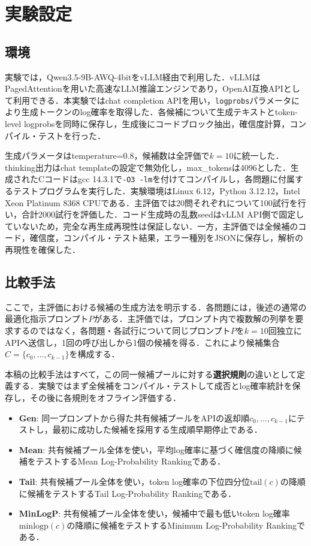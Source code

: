 \documentclass[submit,techrep,noauthor]{ipsj}
\begin{document}
\section{実験設定}

\subsection{環境}

実験では，Qwen3.5-9B-AWQ-4bitをvLLM\cite{kwon2023vllm}経由で利用した．vLLMはPagedAttentionを用いた高速なLLM推論エンジンであり，OpenAI互換APIとして利用できる．本実験ではchat completion APIを用い，\texttt{logprobs}パラメータにより生成トークンのlog確率を取得した．各候補について生成テキストとtoken-level logprobsを同時に保存し，生成後にコードブロック抽出，確信度計算，コンパイル・テストを行った．

生成パラメータはtemperature=0.8，候補数は全評価で$k=10$に統一した．thinking出力はchat templateの設定で無効化し，max\_tokensは4096とした．生成されたCコードはgcc 14.3.1で\texttt{-O3 -lm}を付けてコンパイルし，各問題に付属するテストプログラムを実行した．実験環境はLinux 6.12，Python 3.12.12，Intel Xeon Platinum 8368 CPUである．主評価では20問それぞれについて100試行を行い，合計2000試行を評価した．コード生成時の乱数seedはvLLM API側で固定していないため，完全な再生成再現性は保証しない．一方，主評価では全候補のコード，確信度，コンパイル・テスト結果，エラー種別をJSONに保存し，解析の再現性を確保した．


\subsection{比較手法}

ここで，主評価における候補の生成方法を明示する．各問題には，後述の通常の最適化指示プロンプト$P$がある．主評価では，プロンプト内で複数解の列挙を要求するのではなく，各問題・各試行について同じプロンプト$P$を$k=10$回独立にAPIへ送信し，1回の呼び出しから1個の候補を得る．これにより候補集合$C=\{c_0,\ldots,c_{k-1}\}$を構成する．

本稿の比較手法はすべて，この同一候補プールに対する\textbf{選択規則}の違いとして定義する．実験ではまず全候補をコンパイル・テストして成否とlog確率統計を保存し，その後に各規則をオフライン評価する．

\begin{itemize}
\item \textbf{Gen}: 同一プロンプトから得た共有候補プールをAPIの返却順$c_0,\ldots,c_{k-1}$にテストし，最初に成功した候補を採用する生成順早期停止である．
\item \textbf{Mean}: 共有候補プール全体を使い，平均log確率に基づく確信度の降順に候補をテストするMean Log-Probability Rankingである．
\item \textbf{Tail}: 共有候補プール全体を使い，token log確率の下位四分位$\text{tail}(c)$の降順に候補をテストするTail Log-Probability Rankingである．
\item \textbf{MinLogP}: 共有候補プール全体を使い，候補中で最も低いtoken log確率$\text{minlogp}(c)$の降順に候補をテストするMinimum Log-Probability Rankingである．
\end{itemize}
\end{document}

